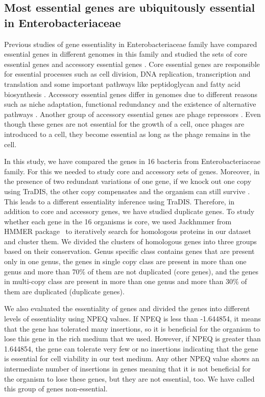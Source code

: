 \documentclass[12pt,letterpaper]{article}
\begin{document}
\subsection{Most essential genes are ubiquitously essential in Enterobacteriaceae}
Previous studies of gene essentiality in Enterobacteriaceae family have compared essential genes in different genomes in this family and studied the sets of core essential genes and accessory essential genes \cite{freed_combining_2016, canals_high-throughput_2012, barquist_comparison_2013}. Core essential genes are responsible for essential processes such as cell division, DNA replication, transcription and translation and some important pathways like peptidoglycan and fatty acid biosynthesis \cite{barquist_comparison_2013}. Accessory essential genes differ in genomes due to different reasons such as niche adaptation, functional redundancy and the existence of alternative pathways \cite{freed_combining_2016, canals_high-throughput_2012, barquist_comparison_2013, bergmiller_patterns_2012}. Another group of accessory essential genes are phage repressors \cite{barquist_comparison_2013}. Even though these genes are not essential for the growth of a cell, once phages are introduced to a cell, they become essential as long as the phage remains in the cell.

In this study, we have compared the genes in 16 bacteria from Enterobacteriaceae family. For this we needed to study core and accessory sets of genes. Moreover, in the presence of two redundant variations of one gene, if we knock out one copy using TraDIS, the other copy compensates and the organism can still survive \cite{bergmiller_patterns_2012,dean_pervasive_2008}. This leads to a different essentiality inference using TraDIS. Therefore, in addition to core and accessory genes, we have studied duplicate genes. To study whether each gene in the 16 organisms is core, we used Jackhmmer from HMMER package~\cite{eddy_accelerated_2011} to iteratively search for homologous proteins in our dataset and cluster them. We divided the clusters of homologous genes into three groups based on their conservation. Genus specific class contains genes that are present only in one genus, the genes in single copy class are present in more than one genus and more than 70\% of them are not duplicated (core genes), and  the genes in multi-copy class are present in more than one genus and more than 30\% of them are duplicated (duplicate genes).

We also evaluated the essentiality of genes and divided the genes into different levels of essentiality using NPEQ values. If NPEQ is less than -1.644854, it means that the gene has tolerated many insertions, so it is beneficial for the organism to lose this gene in the rich medium that we used. However, if NPEQ is greater than 1.644854, the gene can tolerate very few or no insertions indicating that the gene is essential for cell viability in our test medium. Any other NPEQ value shows an intermediate number of insertions in genes meaning that it is not beneficial for the organism to lose these genes, but they are not essential, too. We have called this group of genes non-essential.
\end{document}
